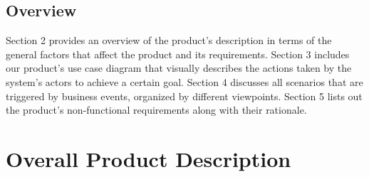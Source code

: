 \documentclass[]{article}
\begin{document}
\subsection{Overview}
\label{sub:overview}
Section 2 provides an overview of the product’s description in terms of the general factors that affect the product and its requirements. Section 3 includes our product’s use case diagram that visually describes the actions taken by the system’s actors to achieve a certain goal. Section 4 discusses all scenarios that are triggered by business events, organized by different viewpoints. Section 5 lists out the product’s non-functional requirements along with their rationale.


\section{Overall Product Description}
\label{sec:overall_description}
\end{document}
